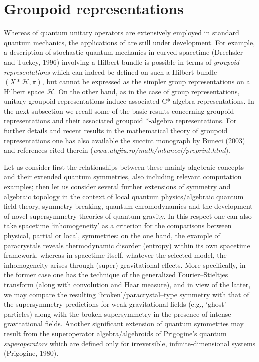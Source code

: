 \documentclass[12pt]{article}
\theoremstyle{plain}
\theoremstyle{definition}
\numberwithin{equation}{section}
\renewcommand{\H}{\mathcal H}
\newcommand{\<}{{\langle}}
\begin{document}
\section{Groupoid representations}

Whereas  of quantum unitary operators are
extensively employed in standard quantum mechanics, the applications of 
are still under development. For example, a description of stochastic quantum
mechanics in curved spacetime (Drechsler and Tuckey, 1996)
involving a Hilbert bundle is possible in terms of
\textit{groupoid representations} which can indeed be defined on
such a Hilbert bundle $(X*\H,\pi)$, but cannot be expressed as
the simpler group representations on a Hilbert space $\H$. On the
other hand, as in the case of group representations, unitary
groupoid representations induce associated C*-algebra
representations. In the next subsection we recall some of the
basic results concerning groupoid representations and their
associated groupoid *-algebra representations. For further
details and recent results in the mathematical theory of groupoid
representations one has also available the succint monograph by
Buneci (2003) and references cited therein (\textit{www.utgjiu.ro/math/mbuneci/preprint.html}).

Let us consider first the relationships between these mainly algebraic concepts and their extended
quantum symmetries, also including relevant computation examples;
then let us consider several further extensions of symmetry
and algebraic topology in the context of local quantum physics/algebraic quantum field theory,
symmetry breaking, quantum chromodynamics and the  development of novel supersymmetry theories of quantum gravity.
In this respect one can also take spacetime `inhomogeneity' as a
criterion for the comparisons between physical, partial or local,
symmetries: on the one hand, the example of paracrystals
reveals thermodynamic disorder (entropy) within its own spacetime
framework, whereas in spacetime itself, whatever the selected
model, the inhomogeneity arises through (super) gravitational
effects. More specifically, in the former case one has the
technique of the generalized Fourier--Stieltjes transform (along
with convolution and Haar measure), and in view of the latter, we
may compare the resulting `broken'/paracrystal--type symmetry with
that of the supersymmetry predictions for weak gravitational
fields (e.g., `ghost' particles) along with the broken
supersymmetry in the presence of intense gravitational fields.
Another significant extension of quantum symmetries may result
from the superoperator algebra/algebroids of Prigogine's quantum
\textit{superoperators} which are defined only for irreversible,
infinite-dimensional systems (Prigogine, 1980).
\end{document}

